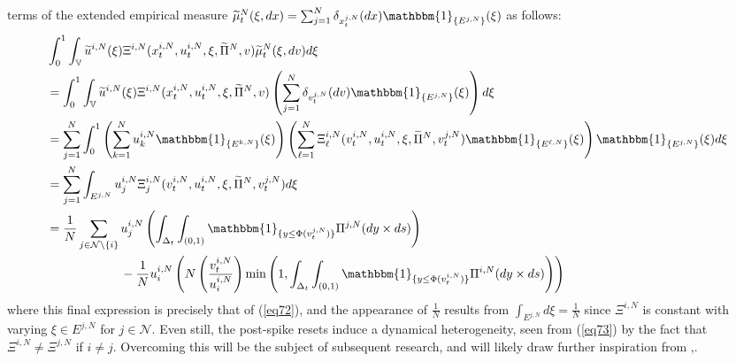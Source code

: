 \documentclass[12pt, oneside]{report}
\newcommand{\mbb}[1]{\mathbb{#1}}
\newcommand{\1}[1]{\mathbbm{1}_{\{#1\}}}
\newcommand{\mc}[1]{\mathcal{#1}}
\theoremstyle{definition}
\begin{document}
terms of the extended empirical measure
$\widetilde{\mu}^N_t(\xi,dx)=\sum_{j=1}^N\delta_{x^{j,N}_t}(dx)\1{E^{j,N}}(\xi)$
as follows:
\begin{alignat*}{2}
    &\int_0^1\int_\mbb{V}\widetilde{u}^{i,N}(\xi)\Xi^{i,N}(x^{i,N}_t,u^{i,N}_t,\xi,\widetilde{\Pi}^N,v)\widetilde{\mu}^N_t(\xi,dv)d\xi\\
    &=\int_0^1\int_\mbb{V}\widetilde{u}^{i,N}(\xi)\Xi^{i,N}(x^{i,N}_t,u^{i,N}_t,\xi,\widetilde{\Pi}^N,v)\left(\sum_{j=1}^N\delta_{v^{j,N}_t}(dv)\1{E^{j,N}}(\xi)\right)d\xi\\
    &=\sum_{j=1}^N\int_0^1\left(\sum_{k=1}^N
    u^{i,N}_k\1{E^{k,N}}(\xi)\right)\left(\sum_{\ell=1}^N\Xi^{i,N}_\ell(v^{i,N}_t,u^{i,N}_t,\xi,\widetilde{\Pi}^N,v^{j,N}_t)\1{E^{\ell,N}}(\xi)\right)\1{E^{j,N}}(\xi)d\xi\\
    &=\sum_{j=1}^N\int_{E^{j,N}}u^{i,N}_j\Xi^{i,N}_j(v^{i,N}_t,u^{i,N}_t,\xi,\widetilde{\Pi}^N,v^{j,N}_t)d\xi\\
    &=\frac{1}{N}\sum_{j\in\mc{N}\setminus\{i\}}u^{i,N}_j\left(\int_{\Delta_t}\int_{(0,1)}\1{y\leq
    \Phi(v^{j,N}_t)}\Pi^{j,N}(dy\times ds)\right)\\
    &\qquad\qquad\qquad-\frac{1}{N}u^{i,N}_i\left(N\left(\frac{v^{i,N}_t}{u^{i,N}_i}\right)\min\left(1,\int_{\Delta_t}\int_{(0,1)}\1{y\leq\Phi(v^{i,N}_t)}\Pi^{i,N}(dy\times
    ds)\right)\right)
\end{alignat*}
where this final expression is precisely that of (\ref{eq72}), and the
appearance of $\frac{1}{N}$ results from $\int_{E^{j,N}}d\xi=\frac{1}{N}$ since
$\Xi^{i,N}$ is constant with varying $\xi\in E^{j,N}$ for $j\in\mc{N}$. Even
still, the post-spike resets induce a dynamical heterogeneity, seen from
(\ref{eq73}) by the fact that $\Xi^{i,N}\neq\Xi^{j,N}$ if $i\neq j$. Overcoming
this will be the subject of subsequent research, and will likely draw further
inspiration from \cite{Jabin_Zhou_2023},\cite{Jabin_Schmutz_Zhou_2024}.
\end{document}

